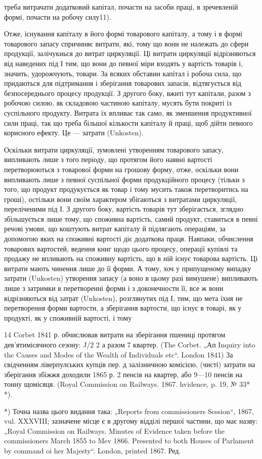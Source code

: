 треба витрачати додатковий капітал, почасти на засоби праці, в зречевленій
формі, почасти на робочу силу11).

Отже, існування капіталу в його формі товарового капіталу, а тому
і в формі товарового запасу спричиняє витрати, які, тому що вони не належать
до сфери продукції, залічукиься до витрат циркуляції. Ці витрати
циркуляції відрізняються від наведених під І тим, що вони до певної
міри входять у вартість товарів і, значить, удорожчують, товари. За всяких
обставин капітал і робоча сила, що придаються для підтримання і
зберігання товарових запасів, відтягується від безпосереднього процесу
продукції. З другого боку, вжиті тут капітали, разом з робочою силою,
як складовою частиною капіталу, мусять бути покриті із суспільного
продукту. Витрата їх впливає так само, як зменшення продуктивної сили
праці, так що треба більшої кількости капіталу й праці, щоб дійти певного
корисного ефекту. Це — затрати (Unkosten).

Оскільки витрати циркуляції, зумовлені утворенням товарового запасу,
випливають лише з того періоду, що протягом його наявні вартості
перетворюються з товарової форми на грошову форму, отже, оскільки
вони випливають лише з певної суспільної форми продукційного процесу
(тільки з того, що продукт продукується як товар і тому мусить також
перетворитись на гроші), остільки вони своїм характером збігаються з витратами
циркуляції, переліченими під І. З другого боку, вартість товарів тут зберігається,
зглядно збільшується лише тому, що споживна вартість, самий
продукт, ставиться в певні речові умови, що коштують витрат капіталу й
підлягають операціям, за допомогою яких на споживні вартості діє
додаткова праця. Навпаки, обчислення товарових вартостей, ведення книг
щодо цього процесу, операції купівлі та продажу не впливають на споживну
вартість, що в ній існує товарова вартість. Ці витрати мають
чинення лише до її форми. А тому, хоч у припущеному випадку
затрати (Unkosten) утворення запасу (а воно в цьому разі вимушене)
випливають лише з затримки в перетворенні форми і з доконечности її,
все ж вони відрізняються від затрат (Unkosten), розглянутих під І, тим,
що мета їхня не перетворення форми вартости, а зберігання вартости,
що існує в товарі, як у продукті, як у споживній вартості, і тому

14 Corbet 1841 р. обчислював витрати на зберігання пшениці протягом дев'ятимісячного
сезону: J/2%
2%
а разом 7%
квартер. (The Corbet. „Ап Inquiry into the Causes and Modes of the Wealth of
Individuals etc“. London 1841) За свідченням ліверпулських купців пер. д залізничною
комісією, (чисті) затрати на зберігання збіжжя доходили 1865 р. 2 пенсів
на квартер, або 9—10 пенсів на тонну щомісяця. (Royal Commission on Railways.
1867. hvidence, p. 19, № 33* *).

*) Точна назва цього видання така: „Reports from commissioners Session“,
1867, vul. XXXVIII; зазначене місце є в другому відділі першої частини, що має
назву: „Royal Commission on Railways. Minutes of Evidence taken before the commissioners
March 1855 to Mev 1866. Presented to both Houses of Parlament by
command oi her Majesty“. London, printed 1867. Ред.
